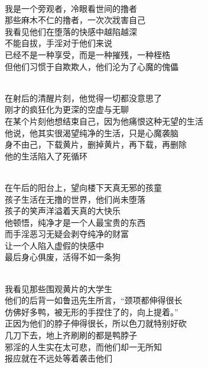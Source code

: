 \begin{poem}[不要把自己射进地狱]
    \begin{multicols}{2}
        \begin{center}~\\
            我是一个旁观者，冷眼看世间的撸者 \\ 那些麻木不仁的撸者，一次次戕害自己 \\ 我看见他们在堕落的快感中越陷越深 \\ 不能自拔，手淫对于他们来说 \\ 已经不是一种享受，而是一种摧残，一种桎梏 \\ 但他们习惯于自欺欺人，他们沦为了心魔的傀儡

            ~\\

            在射后的清醒片刻，他觉得一切都没意思了 \\ 刚才的疯狂化为更深的空虚与无聊 \\ 在某个片刻他想结束自己，因为他痛恨这种无望的生活 \\ 他说，他其实很渴望纯净的生活，只是心魔袭脑 \\ 身不由己，下载黄片，删掉黄片，再下载，再删除 \\ 他的生活陷入了死循环

            ~\\

            在午后的阳台上，望向楼下天真无邪的孩童 \\ 孩子生活在无撸的世界，他们尚未堕落 \\ 孩子的笑声洋溢着天真的大快乐 \\ 他顿悟，纯净才是一个人最宝贵的东西 \\ 而手淫恶习无疑会剥夺纯净的财富 \\ 让一个人陷入虚假的快感中 \\ 最后身心俱废，活得不如一条狗

            ~\\

            我看见那些围观黄片的大学生 \\ 他们的后背一如鲁迅先生所言，“颈项都伸得很长 \\ 仿佛好多鸭，被无形的手捏住了的，向上提着。” \\ 正因为他们的脖子伸得很长，所以色刀就特别好砍 \\ 几刀下去，地上齐刷刷的都是鸭脖子 \\ 邪淫的人生实在太可悲，而他们却一无所知 \\ 报应就在不远处等着袭击他们


\end{center}
\end{multicols}
\end{poem}

